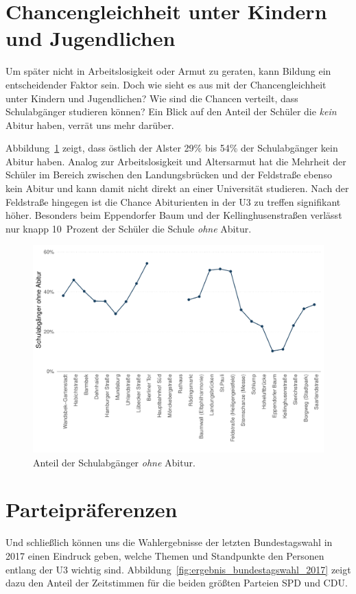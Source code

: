 \documentclass[10pt,a4paper]{article}
\begin{document}
\section*{Chancengleichheit unter Kindern und Jugendlichen}
Um später nicht in Arbeitslosigkeit oder Armut zu geraten, kann Bildung ein entscheidender Faktor sein. Doch wie sieht es aus mit der Chancengleichheit unter Kindern und Jugendlichen? Wie sind die Chancen verteilt, dass Schulabgänger studieren können? Ein Blick auf den Anteil der Schüler die \textit{kein} Abitur haben, verrät uns mehr darüber.

Abbildung~\ref{fig:schulabgaenger_ohne_abitur} zeigt, dass östlich der Alster 29\% bis 54\% der Schulabgänger kein Abitur haben. Analog zur Arbeitslosigkeit und Altersarmut hat die Mehrheit der Schüler im Bereich zwischen den Landungsbrücken und der Feldstraße ebenso kein Abitur und kann damit nicht direkt an einer Universität studieren. Nach der Feldstraße hingegen ist die Chance Abiturienten in der U3 zu treffen signifikant höher. Besonders beim Eppendorfer Baum und der Kellinghusenstraßen verlässt nur knapp 10~Prozent der Schüler die Schule \textit{ohne} Abitur.

\begin{figure}[h!]
	\centering
	\caption{Anteil der Schulabgänger \textit{ohne} Abitur.}
	\label{fig:schulabgaenger_ohne_abitur}
	\includegraphics[width=0.8\linewidth]{../../02_results/fig_schulabgaenger_ohne_abitur.pdf}
\end{figure}


\section*{Parteipräferenzen}
Und schließlich können uns die Wahlergebnisse der letzten Bundestagswahl in 2017 einen Eindruck geben, welche Themen und Standpunkte den Personen entlang der U3 wichtig sind. Abbildung~\ref{fig:ergebnis_bundestagswahl_2017} zeigt dazu den Anteil der Zeitstimmen für die beiden größten Parteien SPD und CDU.
\end{document}
